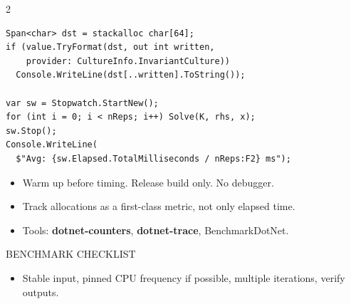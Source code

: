 \documentclass[9pt,a4paper]{extarticle}
\newenvironment{card}[3][acBlue]{%
  \begin{tcolorbox}[
    enhanced, colback=#2, colframe=bdCard,
    coltitle=black, colbacktitle=#2!70!bgHdr,
    fonttitle=\bfseries\fontsize{6.0pt}{7.2pt}\selectfont\MakeUppercase,
    title={#3},
    left=3pt, right=2pt, top=1.2pt, bottom=1.6pt,
    toptitle=1.0pt, bottomtitle=1.0pt,
    boxrule=0.4pt,
    borderline west={3pt}{0pt}{#1},
    arc=2pt, before skip=0pt, after skip=1.6mm,
    breakable,
  ]}{\end{tcolorbox}}
\newcommand{\sub}[1]{{\fontsize{5.5pt}{6.8pt}\selectfont\color{gray}\MakeUppercase{#1}}\par\vspace{1pt}}
\newcommand{\code}[1]{{\ttfamily\bfseries #1}}
\begin{document}
\begin{multicols}{2}
\begin{card}[acBlue]{bgBlue}{Diagnostics and Measurement}
\begin{lstlisting}[style=cs]
Span<char> dst = stackalloc char[64];
if (value.TryFormat(dst, out int written,
    provider: CultureInfo.InvariantCulture))
  Console.WriteLine(dst[..written].ToString());

var sw = Stopwatch.StartNew();
for (int i = 0; i < nReps; i++) Solve(K, rhs, x);
sw.Stop();
Console.WriteLine(
  $"Avg: {sw.Elapsed.TotalMilliseconds / nReps:F2} ms");
\end{lstlisting}
\begin{itemize}
\item Warm up before timing. Release build only. No debugger.
\item Track allocations as a first-class metric, not only elapsed time.
\item Tools: \code{dotnet-counters}, \code{dotnet-trace}, BenchmarkDotNet.
\end{itemize}
\sub{Benchmark checklist}
\begin{itemize}
\item Stable input, pinned CPU frequency if possible, multiple iterations, verify outputs.
\end{itemize}
\end{card}

\end{multicols}
\end{document}
